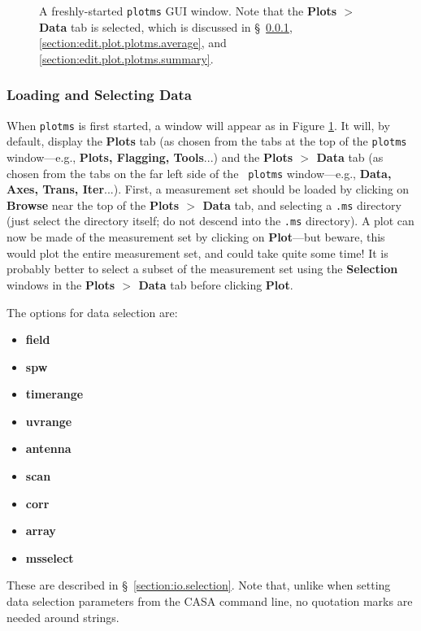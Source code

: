 \begin{figure}[h!]
\begin{center}
\caption{\label{fig:plotms_empty} A freshly-started {\tt plotms} GUI
  window. Note that the {\bf Plots $>$ Data} tab is selected, which is
  discussed in \S~\ref{section:edit.plot.plotms.select},
  \ref{section:edit.plot.plotms.average}, and
  \ref{section:edit.plot.plotms.summary}.}
\hrulefill
\end{center}
\end{figure}

\subsubsection{Loading and Selecting Data}
\label{section:edit.plot.plotms.select}

When {\tt plotms} is first started, a window will appear as in Figure
\ref{fig:plotms_empty}. It will, by default, display the {\bf Plots}
tab (as chosen from the tabs at the top of the {\tt plotms}
window---e.g., {\bf Plots, Flagging, Tools}...) and the {\bf Plots $>$
  Data} tab (as chosen from the tabs on the far left side of the {\tt
  plotms} window---e.g., {\bf Data, Axes, Trans, Iter}...). First, a
measurement set should be loaded by clicking on {\bf Browse} near the
top of the {\bf Plots $>$ Data} tab, and selecting a {\tt .ms}
directory (just select the directory itself; do not descend into the
{\tt .ms} directory). A plot can now be made of the measurement set by
clicking on {\bf Plot}---but beware, this would plot the entire
measurement set, and could take quite some time! It is probably better
to select a subset of the measurement set using the {\bf Selection}
windows in the {\bf Plots $>$ Data} tab before clicking {\bf
  Plot}. 

The options for data selection are:
\begin{itemize}
   \item {\bf field}
   \item {\bf spw}
   \item {\bf timerange}
   \item {\bf uvrange}
   \item {\bf antenna}
   \item {\bf scan}
   \item {\bf corr}
   \item {\bf array}
   \item {\bf msselect}
\end{itemize}
These are described in \S~\ref{section:io.selection}. Note that,
unlike when setting data selection parameters from the CASA command
line, no quotation marks are needed around strings.

